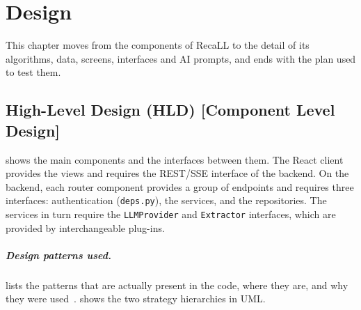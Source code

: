 \chapter{Design}\label{ch:design}

This chapter moves from the components of RecaLL to the detail of its algorithms, data,
screens, interfaces and AI prompts, and ends with the plan used to test them.

\section{High-Level Design (HLD) [Component Level Design]}\label{sec:hld}

 shows the main components and the interfaces between them. The
React client provides the views and requires the REST/SSE interface of the backend. On
the backend, each router component provides a group of endpoints and requires three
interfaces: authentication (\texttt{deps.py}), the services, and the repositories. The
services in turn require the \texttt{LLMProvider} and \texttt{Extractor} interfaces,
which are provided by interchangeable plug-ins.


\paragraph{Design patterns used.}
 lists the patterns that are actually present in the code, where
they are, and why they were used~\cite{gamma1994,fowler2002}.  shows
the two strategy hierarchies in UML.


